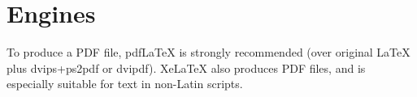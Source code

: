 \documentclass[11pt]{article}
\begin{document}
\section{Engines}

To produce a PDF file, pdf\LaTeX{} is strongly recommended (over original \LaTeX{} plus dvips+ps2pdf or dvipdf). Xe\LaTeX{} also produces PDF files, and is especially suitable for text in non-Latin scripts.







\end{document}
